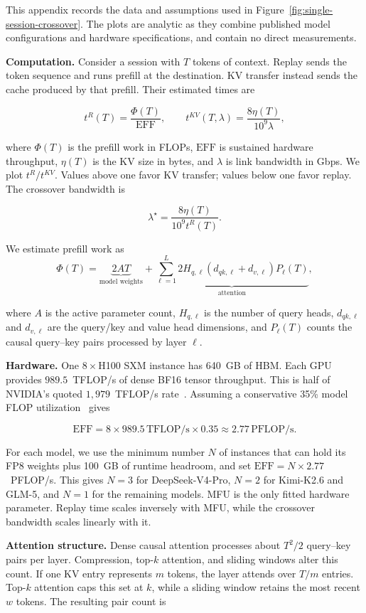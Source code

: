 This appendix records the data and assumptions used in Figure~\ref{fig:single-session-crossover}. The plots are analytic as they combine published model configurations and hardware specifications, and contain no direct measurements.

\noindent\textbf{Computation.}
Consider a session with \(T\) tokens of context. Replay sends the token
sequence and runs prefill at the destination. KV transfer instead sends the
cache produced by that prefill. Their estimated times are

\[
t^{R}(T)
=
\frac{\Phi(T)}{\mathrm{EFF}},
\qquad
t^{KV}(T,\lambda)
=
\frac{8\eta(T)}{10^9\lambda},
\]

where \(\Phi(T)\) is the prefill work in FLOPs, \(\mathrm{EFF}\) is sustained
hardware throughput, \(\eta(T)\) is the KV size in bytes, and \(\lambda\) is
link bandwidth in Gbps. We plot $t^{R}/t^{KV}.$ Values above one favor KV transfer; values below one favor replay. The
crossover bandwidth is

\[
\lambda^\star
=
\frac{8\eta(T)}{10^9t^{R}(T)}.
\]

We estimate prefill work as
\[
\Phi(T)
=
\underbrace{2AT}_{\text{model weights}}
+
\underbrace{
\sum_{\ell=1}^{L}
2H_{q,\ell}(d_{qk,\ell}+d_{v,\ell})P_\ell(T)
}_{\text{attention}},
\]

where \(A\) is the active parameter count, \(H_{q,\ell}\) is the number of query
heads, \(d_{qk,\ell}\) and \(d_{v,\ell}\) are the query/key and value head dimensions, and
\(P_\ell(T)\) counts the causal query--key pairs processed by layer \(\ell\).

\noindent\textbf{Hardware.}
One \(8\times\)H100 SXM instance has 640~GB of HBM. Each GPU provides
\(989.5\)~TFLOP/s of dense BF16 tensor throughput. This is half of NVIDIA's
quoted \(1{,}979\)~TFLOP/s rate~\cite{nvidia2024h100}. Assuming a conservative
35\% model FLOP utilization~\cite{rpa} gives

\[
\mathrm{EFF}
=
8 \times 989.5\,\text{TFLOP/s} \times 0.35
\approx
2.77\,\text{PFLOP/s}.
\]

For each model, we use the minimum number \(N\) of instances that can hold its
FP8 weights plus 100~GB of runtime headroom, and set
\(\mathrm{EFF}=N\times2.77\)~PFLOP/s. This gives \(N=3\) for DeepSeek-V4-Pro,
\(N=2\) for Kimi-K2.6 and GLM-5, and \(N=1\) for the remaining models.
MFU is the only fitted hardware parameter. Replay time scales inversely with
MFU, while the crossover bandwidth scales linearly with it.

\noindent\textbf{Attention structure.}
Dense causal attention processes about \(T^2/2\) query--key pairs per layer.
Compression, top-\(k\) attention, and sliding windows alter this count. If one
KV entry represents \(m\) tokens, the layer attends over \(T/m\) entries.
Top-\(k\) attention caps this set at \(k\), while a sliding window retains the
most recent \(w\) tokens. The resulting pair count is

